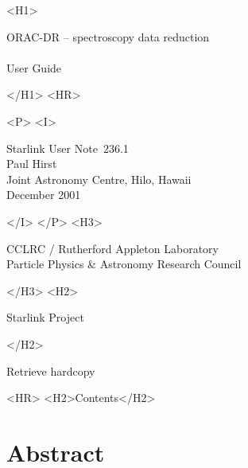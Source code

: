 \documentclass[twoside,11pt]{article}
\newcommand{\stardoccategory}  {Starlink User Note}
\newcommand{\stardocsource}    {sun\stardocnumber}
\newcommand{\stardocnumber}    {236.1}
\newcommand{\stardocauthors}   {Paul Hirst \\
                                Joint Astronomy Centre, Hilo, Hawaii}
\newcommand{\stardocdate}      {December 2001}
\newcommand{\stardoctitle}     {ORAC-DR -- spectroscopy data reduction}
\newcommand{\stardocversion}   {}
\newcommand{\stardocmanual}    {User Guide}
\newcommand{\htmladdnormallink}[2]{#1}
\newcommand{\htmladdimg}[1]{}
\newcommand{\htmlref}[2]{#1}
\newcommand{\htmladdtonavigation}[1]{}
\newcommand{\xlabel}[1]{}
\renewcommand{\_}{\texttt{\symbol{95}}}
\begin{document}
\begin{htmlonly}
   \xlabel{}
   \begin{rawhtml} <H1> \end{rawhtml}
      \stardoctitle\\
      \stardocversion\\
      \stardocmanual
   \begin{rawhtml} </H1> <HR> \end{rawhtml}


   \begin{rawhtml} <P> <I> \end{rawhtml}
   \stardoccategory\ \stardocnumber \\
   \stardocauthors \\
   \stardocdate
   \begin{rawhtml} </I> </P> <H3> \end{rawhtml}
      \htmladdnormallink{CCLRC / Rutherford Appleton Laboratory}
                        {http://www.cclrc.ac.uk} \\
      \htmladdnormallink{Particle Physics \& Astronomy Research Council}
                        {http://www.pparc.ac.uk} \\
   \begin{rawhtml} </H3> <H2> \end{rawhtml}
      \htmladdnormallink{Starlink Project}{http://www.starlink.rl.ac.uk/}
   \begin{rawhtml} </H2> \end{rawhtml}
   \htmladdnormallink{\htmladdimg{source.gif} Retrieve hardcopy}
      {http://www.starlink.rl.ac.uk/cgi-bin/hcserver?\stardocsource}\\

  \label{stardoccontents}
  \begin{rawhtml} 
    <HR>
    <H2>Contents</H2>
  \end{rawhtml}
  \htmladdtonavigation{\htmlref{\htmladdimg{contents_motif.gif}}
        {stardoccontents}}

  \section{\xlabel{abstract}Abstract}
\end{htmlonly}
\end{document}
